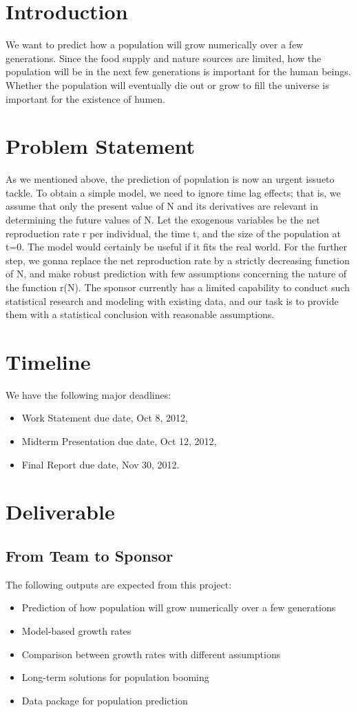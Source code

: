 \documentclass[12pt,letterpaper]{article}
\theoremstyle{definition}
\begin{document}
\section{Introduction} 
We want to predict how a population will grow numerically over a few generations. Since the food supply and nature sources are limited, how the population will be in the next few generations is important for the human beings. Whether the population will eventually die out or grow to fill the universe is important for the existence of humen.

\section{Problem Statement}
As we mentioned above, the prediction of population is now an urgent issueto tackle. To obtain a simple model, we need to ignore time lag effects; that is, we assume that only the present value of N and its derivatives are relevant in determining the future values of N. Let the exogenous variables be the net reproduction rate r per individual, the time t, and the size of the population at t=0. The model would certainly be useful if it fits the real world. For the further step, we gonna replace the net reproduction rate by a strictly decreasing function of N, and make robust prediction with few assumptions concerning the nature of the function r(N).  
The sponsor currently has a limited capability to conduct such statistical research and modeling with existing data, and our task is to provide them with a statistical conclusion with reasonable assumptions.
  
\section{Timeline}
We have the following major deadlines:
\begin{itemize}
    \item Work Statement due date, Oct 8, 2012,
    \item Midterm Presentation due date, Oct 12, 2012,
    \item Final Report due date, Nov 30, 2012.
\end{itemize}

\section{Deliverable}
\subsection{From Team to Sponsor} %
The following outputs are expected from this project:
\begin{itemize}
    \item Prediction of how population will grow numerically over a few generations 
    \item Model-based growth rates
    \item Comparison between growth rates with different assumptions
    \item Long-term solutions for population booming
    \item Data package for population prediction
\end{itemize}
\end{document}
